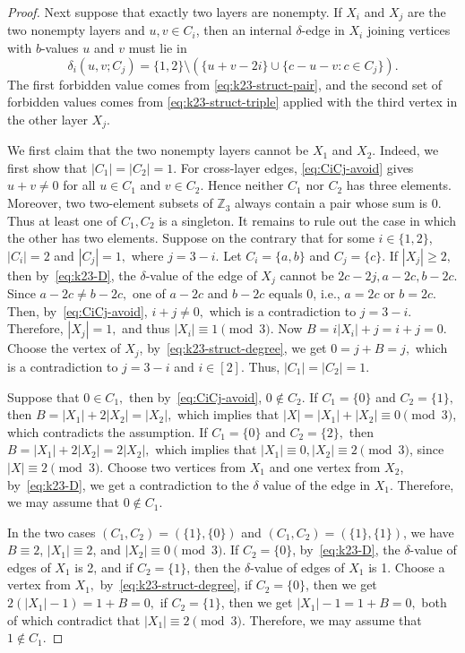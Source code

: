 \documentclass[10pt,a4paper]{amsart}
\newcommand{\Z}{\mathbb Z}
\begin{document}
\begin{proof}
    Next suppose that exactly two layers are nonempty. If \(X_i\) and \(X_j\) are the two nonempty layers and \(u,v\in C_i\), then an internal \(\delta\)-edge in \(X_i\) joining vertices with \(b\)-values \(u\) and \(v\) must lie in
    \begin{equation}\label{eq:k23-D}
        \delta_i(u,v;C_j)
        =\{1,2\}
        \setminus (\{u+v-2i\}\cup \{c-u-v:c\in C_j\}).
    \end{equation}
    The first forbidden value comes from \eqref{eq:k23-struct-pair}, and the second set of forbidden values comes from \eqref{eq:k23-struct-triple} applied with the third vertex in the other layer $X_j$.

    We first claim that the two nonempty layers cannot be $X_1$ and $X_2.$
    Indeed, we first show that $|C_1|=|C_2|=1.$
    For cross-layer edges, \eqref{eq:CiCj-avoid} gives $u+v\ne0$ for all $u\in C_1$ and $v\in C_2$.
    Hence neither $C_1$ nor $C_2$ has three elements. Moreover, two two-element subsets of $\Z_3$ always contain a pair whose sum is $0$. Thus at least one of $C_1,C_2$ is a singleton. It remains to rule out the case in which the other has two elements.
    Suppose on the contrary that for some \(i\in\{1,2\}\), $|C_i|=2$ and $|C_j|=1,$ where $j=3-i.$
    Let $C_i=\{a,b\}$ and $C_j=\{c\}.$
    If $|X_j|\ge 2,$ then by~\eqref{eq:k23-D},
    the $\delta$-value of the edge of $X_j$ cannot be $2c-2j, a-2c, b-2c$. Since $a-2c\neq b-2c,$ one of $a-2c$ and $b-2c$ equals 0, i.e., $a=2c$ or $b=2c.$
    Then, by~\eqref{eq:CiCj-avoid}, $i+j\neq0,$ which is a contradiction to $j=3-i$.
    Therefore, $|X_j|=1,$ and thus $|X_i|\equiv1\pmod3$.
    Now $B=i|X_i|+j=i+j=0.$
    Choose the vertex of $X_j$, by~\eqref{eq:k23-struct-degree}, we get $0=j+B=j,$ which is a contradiction to $j=3-i$ and $i\in[2]$. Thus, $|C_1|=|C_2|=1.$

    Suppose that $0\in C_1,$ then by~\eqref{eq:CiCj-avoid}, $0\notin C_2$.
    If $C_1=\{0\}$ and $C_2=\{1\},$ then $B=|X_1|+2|X_2|=|X_2|,$ which implies that $|X|=|X_1|+|X_2|\equiv0\pmod3$, which contradicts the assumption.
    If $C_1=\{0\}$ and $C_2=\{2\},$ then $B=|X_1|+2|X_2|=2|X_2|,$ which implies that $|X_1|\equiv0, |X_2|\equiv2\pmod3$, since $|X|\equiv2\pmod3$.
    Choose two vertices from \(X_1\) and one vertex from $X_2$, by~\eqref{eq:k23-D}, we get a contradiction to the $\delta$ value of the edge in $X_1$.
    Therefore, we may assume that $0\notin C_1.$

    In the two cases \((C_1,C_2)=(\{1\},\{0\})\) and
    \((C_1,C_2)=(\{1\},\{1\})\), we have
    \(B\equiv2\), \(|X_1|\equiv2\), and \(|X_2|\equiv0\pmod3\).
    If \(C_2=\{0\}\), by~\eqref{eq:k23-D}, the $\delta$-value of edges of $X_1$ is 2, and if \(C_2=\{1\}\), then the $\delta$-value of edges of $X_1$ is 1.
    Choose a vertex from $X_1,$ by~\eqref{eq:k23-struct-degree}, if \(C_2=\{0\}\), then we get $2(|X_1|-1)=1+B=0,$
    if \(C_2=\{1\}\), then we get $|X_1|-1=1+B=0,$
    both of which contradict that $|X_1|\equiv2\pmod3$.
    Therefore, we may assume that $1\notin C_1.$


\end{proof}
\end{document}
